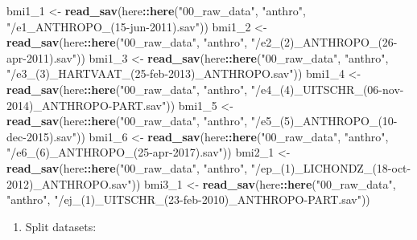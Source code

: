 \documentclass[]{book}
\newenvironment{Shaded}{\begin{snugshade}}{\end{snugshade}}
\newcommand{\DecValTok}[1]{\textcolor[rgb]{0.00,0.00,0.81}{#1}}
\newcommand{\KeywordTok}[1]{\textcolor[rgb]{0.13,0.29,0.53}{\textbf{#1}}}
\newcommand{\NormalTok}[1]{#1}
\newcommand{\OperatorTok}[1]{\textcolor[rgb]{0.81,0.36,0.00}{\textbf{#1}}}
\newcommand{\StringTok}[1]{\textcolor[rgb]{0.31,0.60,0.02}{#1}}
\providecommand{\tightlist}{%
  \setlength{\itemsep}{0pt}\setlength{\parskip}{0pt}}
\begin{document}
\begin{Shaded}
\begin{Highlighting}[]
\NormalTok{bmi1_}\DecValTok{1}\NormalTok{ <-}\StringTok{ }\KeywordTok{read_sav}\NormalTok{(here}\OperatorTok{::}\KeywordTok{here}\NormalTok{(}\StringTok{"00_raw_data"}\NormalTok{, }\StringTok{"anthro"}\NormalTok{, }\StringTok{"/e1_ANTHROPO_(15-jun-2011).sav"}\NormalTok{))}
\NormalTok{bmi1_}\DecValTok{2}\NormalTok{ <-}\StringTok{ }\KeywordTok{read_sav}\NormalTok{(here}\OperatorTok{::}\KeywordTok{here}\NormalTok{(}\StringTok{"00_raw_data"}\NormalTok{, }\StringTok{"anthro"}\NormalTok{, }\StringTok{"/e2_(2)_ANTHROPO_(26-apr-2011).sav"}\NormalTok{))}
\NormalTok{bmi1_}\DecValTok{3}\NormalTok{ <-}\StringTok{ }\KeywordTok{read_sav}\NormalTok{(here}\OperatorTok{::}\KeywordTok{here}\NormalTok{(}\StringTok{"00_raw_data"}\NormalTok{, }\StringTok{"anthro"}\NormalTok{, }\StringTok{"/e3_(3)_HARTVAAT_(25-feb-2013)_ANTHROPO.sav"}\NormalTok{))}
\NormalTok{bmi1_}\DecValTok{4}\NormalTok{ <-}\StringTok{ }\KeywordTok{read_sav}\NormalTok{(here}\OperatorTok{::}\KeywordTok{here}\NormalTok{(}\StringTok{"00_raw_data"}\NormalTok{, }\StringTok{"anthro"}\NormalTok{, }\StringTok{"/e4_(4)_UITSCHR_(06-nov-2014)_ANTHROPO-PART.sav"}\NormalTok{))}
\NormalTok{bmi1_}\DecValTok{5}\NormalTok{ <-}\StringTok{ }\KeywordTok{read_sav}\NormalTok{(here}\OperatorTok{::}\KeywordTok{here}\NormalTok{(}\StringTok{"00_raw_data"}\NormalTok{, }\StringTok{"anthro"}\NormalTok{, }\StringTok{"/e5_(5)_ANTHROPO_(10-dec-2015).sav"}\NormalTok{))}
\NormalTok{bmi1_}\DecValTok{6}\NormalTok{ <-}\StringTok{ }\KeywordTok{read_sav}\NormalTok{(here}\OperatorTok{::}\KeywordTok{here}\NormalTok{(}\StringTok{"00_raw_data"}\NormalTok{, }\StringTok{"anthro"}\NormalTok{, }\StringTok{"/e6_(6)_ANTHROPO_(25-apr-2017).sav"}\NormalTok{))}
\NormalTok{bmi2_}\DecValTok{1}\NormalTok{ <-}\StringTok{ }\KeywordTok{read_sav}\NormalTok{(here}\OperatorTok{::}\KeywordTok{here}\NormalTok{(}\StringTok{"00_raw_data"}\NormalTok{, }\StringTok{"anthro"}\NormalTok{, }\StringTok{"/ep_(1)_LICHONDZ_(18-oct-2012)_ANTHROPO.sav"}\NormalTok{))}
\NormalTok{bmi3_}\DecValTok{1}\NormalTok{ <-}\StringTok{ }\KeywordTok{read_sav}\NormalTok{(here}\OperatorTok{::}\KeywordTok{here}\NormalTok{(}\StringTok{"00_raw_data"}\NormalTok{, }\StringTok{"anthro"}\NormalTok{, }\StringTok{"/ej_(1)_UITSCHR_(23-feb-2010)_ANTHROPO-PART.sav"}\NormalTok{))}
\end{Highlighting}
\end{Shaded}

\begin{enumerate}
\def\labelenumi{\arabic{enumi}.}
\setcounter{enumi}{1}
\tightlist
\item
  Split datasets:
\end{enumerate}
\end{document}

